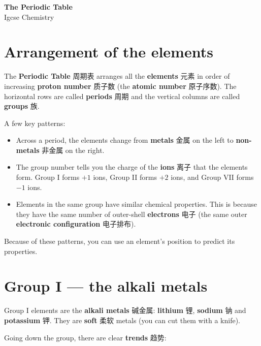 \documentclass[11pt]{article}
\begin{document}
\begin{center}
  {\LARGE\bfseries The Periodic Table}\\[0.35em]
  {\large Igcse Chemistry}
\end{center}
\vspace{0.6em}

\section*{Arrangement of the elements}

The \textbf{Periodic Table} 周期表 arranges all the \textbf{elements} 元素 in order of increasing \textbf{proton number} 质子数 (the \textbf{atomic number} 原子序数). The horizontal rows are called \textbf{periods} 周期 and the vertical columns are called \textbf{groups} 族.

A few key patterns:

\begin{itemize}
\item Across a period, the elements change from \textbf{metals} 金属 on the left to \textbf{non-metals} 非金属 on the right.

\item The group number tells you the charge of the \textbf{ions} 离子 that the elements form. Group I forms $+1$ ions, Group II forms $+2$ ions, and Group VII forms $-1$ ions.

\item Elements in the same group have similar chemical properties. This is because they have the same number of outer-shell \textbf{electrons} 电子 (the same outer \textbf{electronic configuration} 电子排布).

\end{itemize}

Because of these patterns, you can use an element's position to predict its properties.

\section*{Group I — the alkali metals}

Group I elements are the \textbf{alkali metals} 碱金属: \textbf{lithium} 锂, \textbf{sodium} 钠 and \textbf{potassium} 钾. They are \textbf{soft} 柔软 metals (you can cut them with a knife).

Going down the group, there are clear \textbf{trends} 趋势:

\begin{center}
\end{center}
\end{document}
